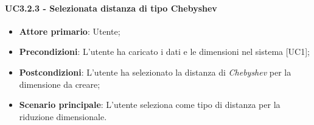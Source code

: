 \paragraph{UC3.2.3 - Selezionata distanza di tipo Chebyshev}
\begin{itemize}
	\item \textbf{Attore primario}: Utente;
	\item \textbf{Precondizioni}: L'utente ha caricato i dati e le dimensioni nel sistema [UC1];
	\item \textbf{Postcondizioni}: L'utente ha selezionato la distanza di \textit{Chebyshev} per la dimensione da creare;
	\item \textbf{Scenario principale}: L'utente seleziona  come tipo di distanza per la riduzione dimensionale.
\end{itemize}
